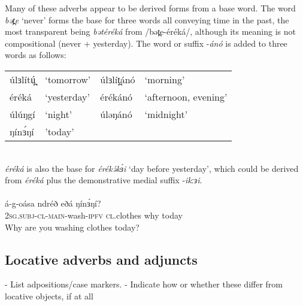 Many of these adverbs appear to be derived forms from a base word. The word \textit{bət̪e} ‘never’ forms the base for three words all conveying time in the past, the most transparent being \textit{bətéréká} from /bət̪e-éréká/, although its meaning is not compositional (never + yesterday). The word or suffix -\textit{ánó} is added to three words as follows:\\

\begin{tabular}[t]{llll}
úlɜlítú̪ &	‘tomorrow’ 	&	úlɜlít̪ánó 	&	‘morning’ \\
éréká 	&	‘yesterday’ 	&	érékánó 		&	‘afternoon, evening’ \\
úlúŋgí	&	‘night’		&	úləŋánó		&	‘midnight’\\
ŋínɜ́ŋí	&	'today'\\

\end{tabular}\\

\textit{éréká} is also the base for \textit{érékə́kɜ́i} ‘day before yesterday’, which could be derived from \textit{éréká} plus the demonstrative medial suffix -\textit{ikːɜi}. 
\\
\\
\gll á-g-oása  ndréð   eðá    ŋínɜ́ŋí?\\
2\textsc{sg.subj-cl-main}-wash-\textsc{ipfv}  \textsc{cl}.clothes  why  today\\
\trans Why are you washing clothes today?\\

\subsection{Locative adverbs and adjuncts}\label{section:locativeadverb}

- List adpositions/case markers. 
- Indicate how or whether these differ from locative objects, if at all

